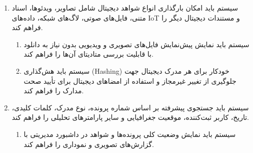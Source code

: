 \documentclass[12pt,a4paper,oneside]{article}
\begin{document}
\begin{itemize}
\begin{enumerate}
            \item 
            سیستم باید امکان بارگذاری انواع شواهد دیجیتال شامل تصاویر، ویدئوها، اسناد متنی، فایل‌های صوتی، لاگ‌های شبکه، داده‌های IoT و مستندات دیجیتال دیگر را فراهم کند.
            \begin{enumerate}
                \renewcommand{\labelenumii}{{\rl{\arabic{enumii}.\arabic{enumi}}}R-}
                \item 
                سیستم باید نمایش پیش‌نمایش فایل‌های تصویری و ویدیویی بدون نیاز به دانلود با قابلیت بررسی متادیتای آن‌ها را فراهم کند.
                \item 
                سیستم باید هش‌گذاری (Hashing) خودکار برای هر مدرک دیجیتال جهت جلوگیری از تغییر غیرمجاز و استفاده از امضاهای دیجیتال برای تأیید صحت مدارک را فراهم کند.
            \end{enumerate}
    
            \item 
            سیستم باید جستجوی پیشرفته بر اساس شماره پرونده، نوع مدرک، کلمات کلیدی، تاریخ، کاربر ثبت‌کننده، موقعیت جغرافیایی و سایر پارامترهای تحلیلی را فراهم کند.
            \begin{enumerate}
                \renewcommand{\labelenumii}{{\rl{\arabic{enumii}.\arabic{enumi}}}R-}
                \item 
                سیستم باید نمایش وضعیت کلی پرونده‌ها و شواهد در داشبورد مدیریتی با گزارش‌های تصویری و نموداری را فراهم کند.
            \end{enumerate}
        \end{enumerate}
    \end{itemize}
\end{document}
